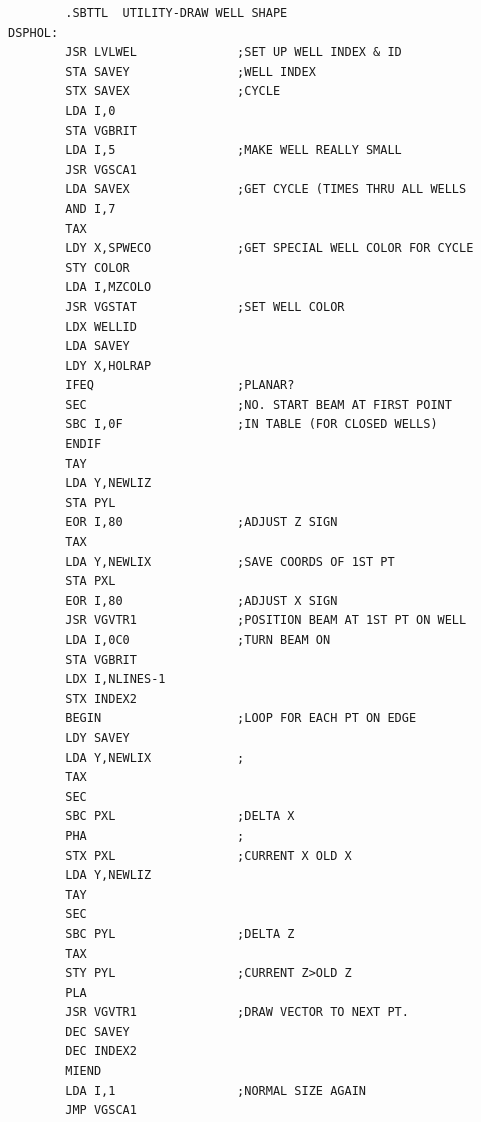 \begin{lstlisting}
        .SBTTL  UTILITY-DRAW WELL SHAPE
DSPHOL:
        JSR LVLWEL              ;SET UP WELL INDEX & ID
        STA SAVEY               ;WELL INDEX
        STX SAVEX               ;CYCLE
        LDA I,0
        STA VGBRIT
        LDA I,5                 ;MAKE WELL REALLY SMALL
        JSR VGSCA1
        LDA SAVEX               ;GET CYCLE (TIMES THRU ALL WELLS
        AND I,7
        TAX
        LDY X,SPWECO            ;GET SPECIAL WELL COLOR FOR CYCLE
        STY COLOR
        LDA I,MZCOLO
        JSR VGSTAT              ;SET WELL COLOR
        LDX WELLID
        LDA SAVEY
        LDY X,HOLRAP
        IFEQ                    ;PLANAR?
        SEC                     ;NO. START BEAM AT FIRST POINT
        SBC I,0F                ;IN TABLE (FOR CLOSED WELLS)
        ENDIF
        TAY
        LDA Y,NEWLIZ
        STA PYL
        EOR I,80                ;ADJUST Z SIGN
        TAX
        LDA Y,NEWLIX            ;SAVE COORDS OF 1ST PT
        STA PXL
        EOR I,80                ;ADJUST X SIGN
        JSR VGVTR1              ;POSITION BEAM AT 1ST PT ON WELL
        LDA I,0C0               ;TURN BEAM ON
        STA VGBRIT
        LDX I,NLINES-1
        STX INDEX2
        BEGIN                   ;LOOP FOR EACH PT ON EDGE
        LDY SAVEY
        LDA Y,NEWLIX            ;
        TAX
        SEC
        SBC PXL                 ;DELTA X
        PHA                     ;
        STX PXL                 ;CURRENT X OLD X
        LDA Y,NEWLIZ
        TAY
        SEC
        SBC PYL                 ;DELTA Z
        TAX
        STY PYL                 ;CURRENT Z>OLD Z
        PLA
        JSR VGVTR1              ;DRAW VECTOR TO NEXT PT.
        DEC SAVEY
        DEC INDEX2
        MIEND
        LDA I,1                 ;NORMAL SIZE AGAIN
        JMP VGSCA1
\end{lstlisting}
